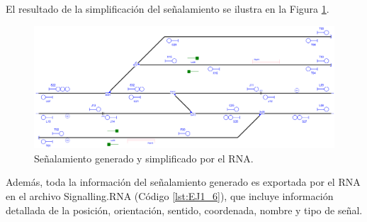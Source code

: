 	El resultado de la simplificación del señalamiento se ilustra en la Figura \ref{fig:EJ1_7}.
	
	\begin{figure}[H]
		\centering
		\includegraphics[width=1\textwidth]{resultados-obtenidos/ejemplo1/images/1_RNA.png}
		\centering\caption{Señalamiento generado y simplificado por el RNA.}
		\label{fig:EJ1_7}
	\end{figure}
	
	Además, toda la información del señalamiento generado es exportada por el RNA en el archivo Signalling.RNA (Código \ref{lst:EJ1_6}), que incluye información detallada de la posición, orientación, sentido, coordenada, nombre y tipo de señal.
		
